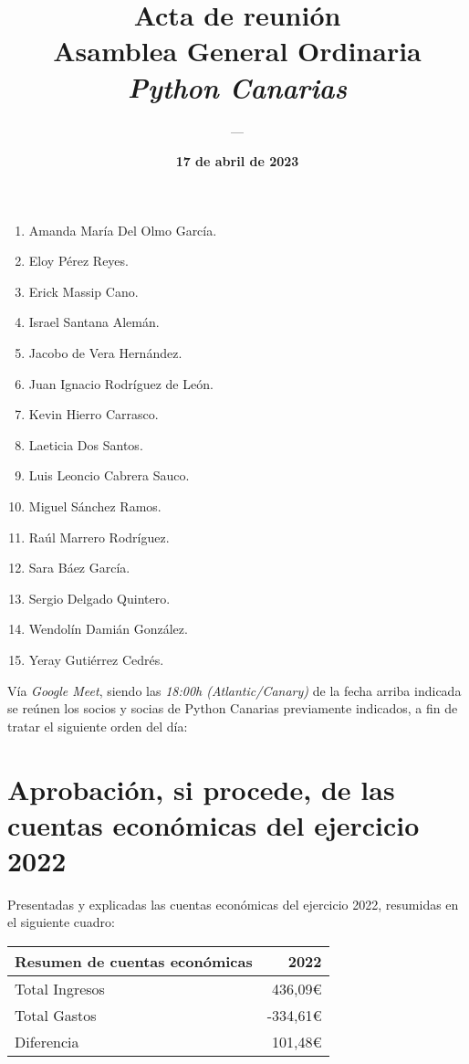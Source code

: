 \documentclass[a4paper,12pt]{article}
\title{\huge \textbf{Acta de reunión} \\ Asamblea General Ordinaria \\ \textit{Python Canarias}}
\date{\textbf{17 de abril de 2023}}
\author{---}
\begin{document}
\renewcommand{\contentsname}{Orden del día}

\maketitle

\begin{enumerate}
    \item Amanda María Del Olmo García.
    \item Eloy Pérez Reyes.
    \item Erick Massip Cano.
    \item Israel Santana Alemán.
    \item Jacobo de Vera Hernández.
    \item Juan Ignacio Rodríguez de León.
    \item Kevin Hierro Carrasco.
    \item Laeticia Dos Santos.
    \item Luis Leoncio Cabrera Sauco.
    \item Miguel Sánchez Ramos.
    \item Raúl Marrero Rodríguez.
    \item Sara Báez García.
    \item Sergio Delgado Quintero.
    \item Wendolín Damián González.
    \item Yeray Gutiérrez Cedrés.
\end{enumerate}

Vía \textit{Google Meet}, siendo las \textit{18:00h (Atlantic/Canary)} de la fecha arriba indicada se reúnen los socios y socias de Python Canarias previamente indicados, a fin de tratar el siguiente orden del día:

\tableofcontents

\vspace{1cm}

\section{Aprobación, si procede, de las cuentas económicas del ejercicio 2022}

Presentadas y explicadas las cuentas económicas del ejercicio 2022, resumidas en el siguiente cuadro:

\begin{center}
    \begin{tabular}{ | l | r | }
        \hline
        \textbf{Resumen de cuentas económicas} & \textbf{2022} \\ 
        \hline
        Total Ingresos & 436,09\euro \\  
        \hline
        Total Gastos & -334,61\euro \\  
        \hline
        \hline
        Diferencia & 101,48\euro \\  
        \hline
    \end{tabular}
\end{center}
\end{document}
